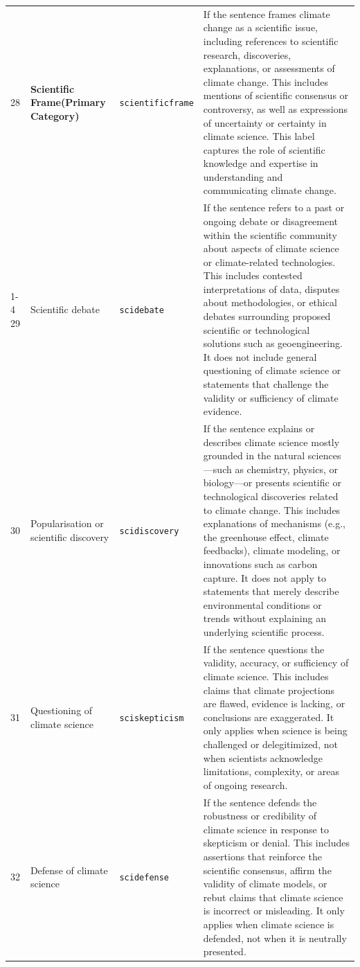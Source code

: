 \documentclass[12pt]{article}
\renewcommand\_{\texttt{\detokenize{_}\allowbreak}}
\begin{document}
{\begin{longtable}{p{0.5cm}p{4.5cm}p{2.8cm}p{13.5cm}}
\midrule
\rowcolor{gray!8}
\multicolumn{4}{l}{\textit{Scientific Frame}} \\
\midrule
28 & \textbf{Scientific Frame\newline (Primary Category)} & \texttt{scientific\_frame} & If the sentence frames climate change as a scientific issue, including references to scientific research, discoveries, explanations, or assessments of climate change. This includes mentions of scientific consensus or controversy, as well as expressions of uncertainty or certainty in climate science. This label captures the role of scientific knowledge and expertise in understanding and communicating climate change. \\
\cmidrule(lr){1-4}
29 & Scientific debate & \texttt{sci\_debate} & If the sentence refers to a past or ongoing debate or disagreement within the scientific community about aspects of climate science or climate-related technologies. This includes contested interpretations of data, disputes about methodologies, or ethical debates surrounding proposed scientific or technological solutions such as geoengineering. It does not include general questioning of climate science or statements that challenge the validity or sufficiency of climate evidence. \\
30 & Popularisation or scientific discovery & \texttt{sci\_discovery} & If the sentence explains or describes climate science mostly grounded in the natural sciences---such as chemistry, physics, or biology---or presents scientific or technological discoveries related to climate change. This includes explanations of mechanisms (e.g., the greenhouse effect, climate feedbacks), climate modeling, or innovations such as carbon capture. It does not apply to statements that merely describe environmental conditions or trends without explaining an underlying scientific process. \\
31 & Questioning of climate science & \texttt{sci\_skepticism} & If the sentence questions the validity, accuracy, or sufficiency of climate science. This includes claims that climate projections are flawed, evidence is lacking, or conclusions are exaggerated. It only applies when science is being challenged or delegitimized, not when scientists acknowledge limitations, complexity, or areas of ongoing research. \\
32 & Defense of climate science & \texttt{sci\_defense} & If the sentence defends the robustness or credibility of climate science in response to skepticism or denial. This includes assertions that reinforce the scientific consensus, affirm the validity of climate models, or rebut claims that climate science is incorrect or misleading. It only applies when climate science is defended, not when it is neutrally presented. \\

\end{longtable}}
\end{document}
